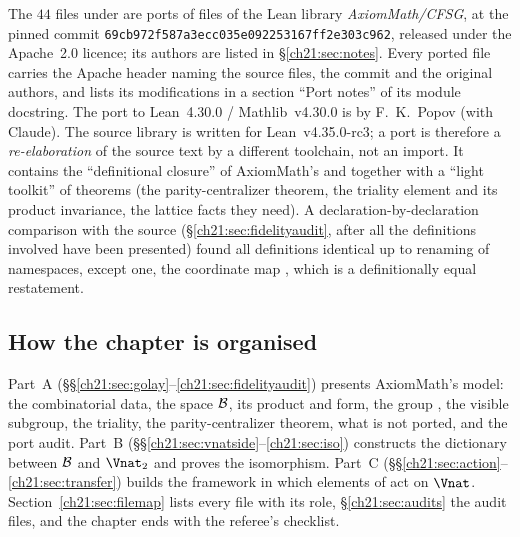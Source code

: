 The $44$ files under  are ports of files
of the Lean library \emph{AxiomMath/CFSG}, at the pinned commit
\texttt{69cb972f587a3ecc035e092253167ff2e303c962}, released under the Apache~2.0 licence; its authors
are listed in \S\ref{ch21:sec:notes}.  Every ported file carries the Apache header naming the source
files, the commit and the original authors, and lists its modifications in a section ``Port notes'' of
its module docstring.  The port to Lean~4.30.0 / Mathlib~v4.30.0 is by F.~K.~Popov (with Claude).
The source library is written for Lean~v4.35.0-rc3; a port is therefore a \emph{re-elaboration} of the
source text by a different toolchain, not an import.  It contains the ``definitional closure'' of
AxiomMath's  and  together with a ``light toolkit'' of theorems (the
parity-centralizer theorem, the triality element and its product invariance, the lattice facts they
need).  A declaration-by-declaration comparison with the source (\S\ref{ch21:sec:fidelityaudit}, after
all the definitions involved have been presented) found all definitions identical up to renaming of
namespaces, except one, the coordinate map , which is a definitionally equal restatement.

\subsection{How the chapter is organised}

Part~A (\S\S\ref{ch21:sec:golay}--\ref{ch21:sec:fidelityaudit}) presents AxiomMath's model: the
combinatorial data, the space $\mathcal{B}$, its product and form, the group , the visible
subgroup, the triality, the parity-centralizer theorem, what is not ported, and the port audit.  Part~B
(\S\S\ref{ch21:sec:vnatside}--\ref{ch21:sec:iso}) constructs the dictionary between $\mathcal{B}$ and
$\Vnat_2$ and proves the isomorphism.  Part~C (\S\S\ref{ch21:sec:action}--\ref{ch21:sec:transfer})
builds the framework in which elements of  act on $\Vnat$.  Section~\ref{ch21:sec:filemap}
lists every file with its role, \S\ref{ch21:sec:audits} the audit files, and the chapter ends
with the referee's checklist.

